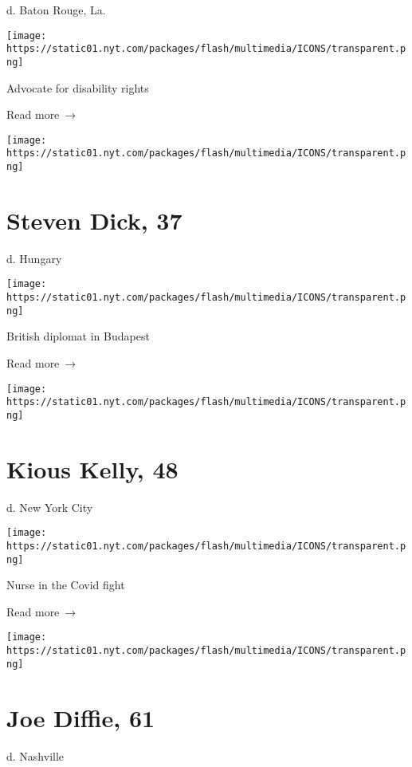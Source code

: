 d. Baton Rouge, La.

\texttt{[image: https://static01.nyt.com/packages/flash/multimedia/ICONS/transparent.png]}

Advocate for disability rights

 Read more~→

\href{https://www.nytimes.com/2020/03/31/obituaries/steven-dick-dead-coronavirus.html}{}

\texttt{[image: https://static01.nyt.com/packages/flash/multimedia/ICONS/transparent.png]}

\hypertarget{steven-dick-37}{%
\section{Steven Dick, 37}\label{steven-dick-37}}

d. Hungary

\texttt{[image: https://static01.nyt.com/packages/flash/multimedia/ICONS/transparent.png]}

British diplomat in Budapest

 Read more~→

\href{https://www.nytimes.com/2020/03/31/obituaries/kious-kelly-dead-coronavirus.html}{}

\texttt{[image: https://static01.nyt.com/packages/flash/multimedia/ICONS/transparent.png]}

\hypertarget{kious-kelly-48}{%
\section{Kious Kelly, 48}\label{kious-kelly-48}}

d. New York City

\texttt{[image: https://static01.nyt.com/packages/flash/multimedia/ICONS/transparent.png]}

Nurse in the Covid fight

 Read more~→

\href{https://www.nytimes.com/2020/03/30/arts/music/joe-diffie-dead-coronavirus.html}{}

\texttt{[image: https://static01.nyt.com/packages/flash/multimedia/ICONS/transparent.png]}

\hypertarget{joe-diffie-61}{%
\section{Joe Diffie, 61}\label{joe-diffie-61}}

d. Nashville

